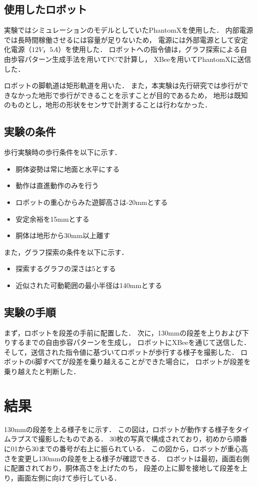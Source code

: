 \subsection{使用したロボット}
実験ではシミュレーションのモデルとしていたPhantomXを使用した．
内部電源では長時間稼働させるには容量が足りないため，
電源には外部電源として安定化電源（$12V，5A$）を使用した．
ロボットへの指令値は，グラフ探索による自由歩容パターン生成手法を用いてPCで計算し，
XBeeを用いてPhantomXに送信した．

ロボットの脚軌道は矩形軌道を用いた．
また，本実験は先行研究では歩行ができなかった地形で歩行ができることを示すことが目的であるため，
地形は既知のものとし，地形の形状をセンサで計測することは行わなかった．

\subsection{実験の条件}
歩行実験時の歩行条件を以下に示す．

\begin{itemize}
  \item 胴体姿勢は常に地面と水平にする
  \item 動作は直進動作のみを行う
  \item ロボットの重心からみた遊脚高さは-20mmとする
  \item 安定余裕を15mmとする
  \item 胴体は地形から30mm以上離す
\end{itemize}

また，グラフ探索の条件を以下に示す．

\begin{itemize}
  \item 探索するグラフの深さは5とする
  \item 近似された可動範囲の最小半径は140mmとする
\end{itemize}

\subsection{実験の手順}
まず，ロボットを段差の手前に配置した．
次に，130mmの段差を上りおよび下りするまでの自由歩容パターンを生成し，
ロボットにXBeeを通じて送信した．
そして，送信された指令値に基づいてロボットが歩行する様子を撮影した．
ロボットの6脚すべてが段差を乗り越えることができた場合に，
ロボットが段差を乗り越えたと判断した．

\section{結果}
130mmの段差を上る様子をに示す．
この図は，ロボットが動作する様子をタイムラプスで撮影したものである．
30枚の写真で構成されており，初めから順番に01から30までの番号が右上に振られている．
この図から，ロボットが重心高さを変更し130mmの段差を上る様子が確認できる．
ロボットは最初，画面右側に配置されており，胴体高さを上げたのち，
段差の上に脚を接地して段差を上り，画面左側に向けて歩行している．

